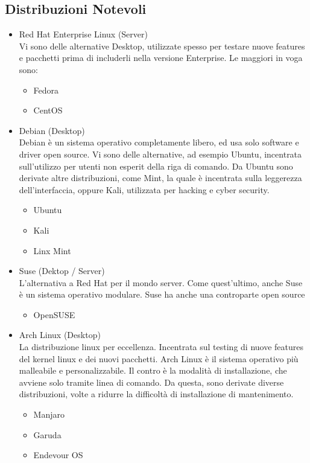 \documentclass[11pt]{book}
\begin{document}
\subsection{Distribuzioni Notevoli}
\begin{itemize}
	\item Red Hat Enterprise Linux (Server)\\
		Vi sono delle alternative Desktop, utilizzate spesso per testare nuove features e pacchetti prima di includerli nella versione Enterprise. Le maggiori in voga sono:
		\begin{itemize}
			\item Fedora
			\item CentOS
		\end{itemize}
	\item Debian (Desktop)\\
		Debian è un sistema operativo completamente libero, ed usa solo software e driver open source. Vi sono delle alternative, ad esempio Ubuntu, incentrata sull'utilizzo per utenti non esperit della riga di comando. Da Ubuntu sono derivate altre distribuzioni, come Mint, la quale è incentrata sulla leggerezza dell'interfaccia, oppure Kali, utilizzata per hacking e cyber security.
	\begin{itemize}
		\item Ubuntu
		\item Kali
		\item Linx Mint
	\end{itemize}
	\item Suse (Dektop / Server)\\
	L'alternativa a Red Hat per il mondo server. Come quest'ultimo, anche Suse è un sistema operativo modulare. Suse ha anche una controparte open source
	\begin{itemize}
		\item OpenSUSE
	\end{itemize}
	\item Arch Linux (Desktop)\\
	La distribuzione linux per eccellenza. Incentrata sul testing di nuove features del kernel linux e dei nuovi pacchetti. Arch Linux è il sistema operativo più malleabile e personalizzabile. Il contro è la modalità di installazione, che avviene solo tramite linea di comando. Da questa, sono derivate diverse distribuzioni, volte a ridurre la difficoltà di installazione di mantenimento. 
	\begin{itemize}
		\item Manjaro
		\item Garuda
		\item Endevour OS
	\end{itemize}
\end{itemize}
\end{document}
